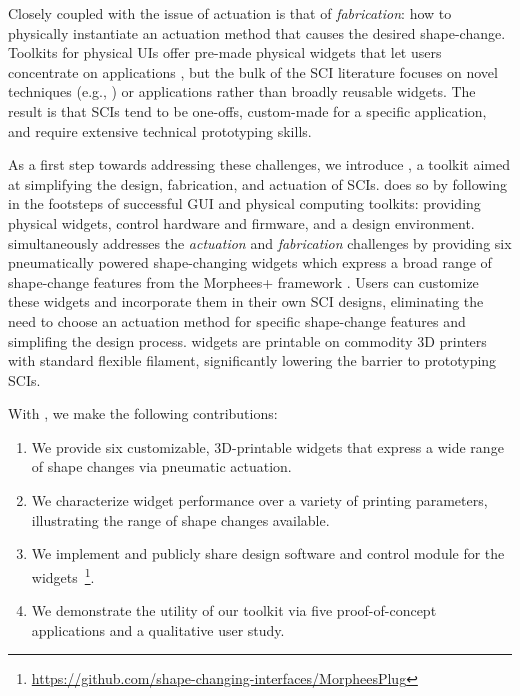     Closely coupled with the issue of actuation is that of
    \textit{fabrication}: how to physically instantiate an actuation method
    that causes the desired shape-change. Toolkits for physical UIs offer
    pre-made physical widgets that let users concentrate on applications
    \cite{Greenberg:2001,Bdeir:2009kz}, but the bulk of the SCI literature
    focuses on novel techniques (e.g., \cite{Ou:2016}) or applications rather
    than broadly reusable widgets. The result is that SCIs tend to be one-offs,
    custom-made for a specific application, and require extensive technical
    prototyping skills.
  
    As a first step towards addressing these challenges, we introduce \mp, a
    toolkit aimed at simplifying the design, fabrication, and actuation of
    SCIs. \mp does so by following in the footsteps of successful GUI
    and physical computing toolkits: providing physical widgets, control
    hardware and firmware, and a design environment. \mp simultaneously
    addresses the \textit{actuation} and \textit{fabrication} challenges by
    providing six pneumatically powered shape-changing widgets which express a
    broad range of shape-change features from the Morphees+ framework
    \cite{10.1145/3173574.3174193}. Users can customize these widgets and
    incorporate them in their own SCI designs, eliminating the need to choose
    an actuation method for specific shape-change features and simplifing the
    design process. \mp widgets are printable on commodity 3D printers with
    standard flexible filament, significantly lowering the barrier to
    prototyping SCIs. 

    With \mp, we make the following contributions:     
      \begin{enumerate}
        \item We provide six customizable, 3D-printable widgets that express
          a wide range of shape changes via pneumatic actuation.
        \item We characterize widget performance over a variety of printing
          parameters, illustrating the range of shape changes available.
        \item We implement and publicly share design software and control
          module for the
          widgets~\footnote{\url{https://github.com/shape-changing-interfaces/MorpheesPlug}}.
        \item We demonstrate the utility of our toolkit via five
          proof-of-concept applications and a qualitative user study.
      \end{enumerate}

